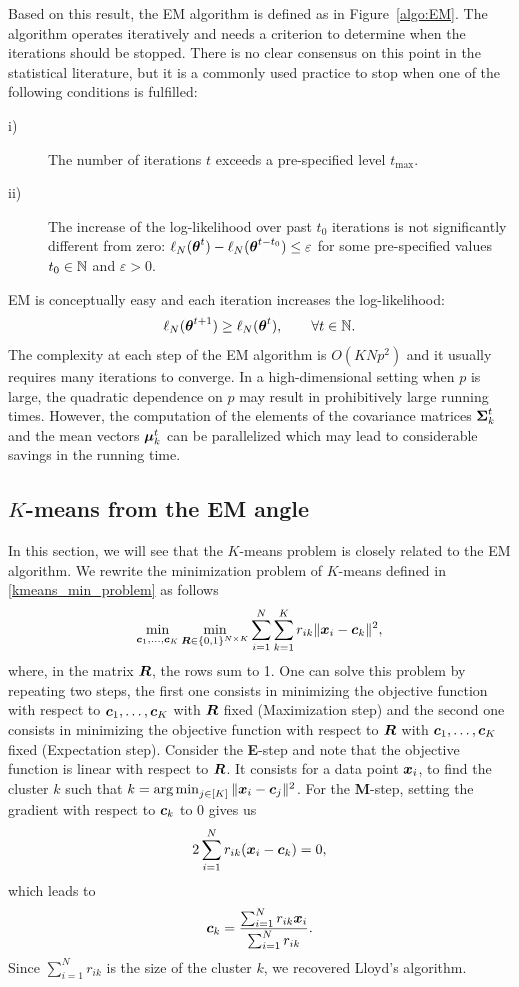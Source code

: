 Based on this result, the EM algorithm is defined as in Figure~\ref{algo:EM}.
The algorithm operates iteratively and needs a criterion to determine when
the iterations should be stopped. There is no clear consensus on this point in the
statistical literature, but it is a commonly used  practice to stop when one of the
following conditions is fulfilled:
\begin{description}
\item[i)]  The number of iterations $t$ exceeds a pre-specified level $t_{\max}$.
\item[ii)] The increase of the log-likelihood over past $t_0$ iterations is not
significantly different from zero: $\ell_N({\boldsymbol\theta}^{t})-\ell_N({\boldsymbol\theta}^{t-t_0})\le \varepsilon$
for some pre-specified values $t_0\in{\mathbb N}$ and $\varepsilon>0$.
\end{description}
EM is conceptually easy and each iteration increases the log-likelihood:
$$
\ell_N({\boldsymbol\theta}^{t+1})\ge \ell_N({\boldsymbol\theta}^{t}),\qquad \forall t\in{\mathbb N}.
$$
The complexity at each step of the EM algorithm is $O(KNp^2)$ and
it usually requires many iterations to converge. In a high-dimensional setting
when $p$ is large, the quadratic dependence on $p$ may result in prohibitively
large running times. However, the computation of the elements of the covariance
matrices $\boldsymbol\Sigma^t_k$ and the mean vectors $\boldsymbol\mu^t_k$ can be parallelized which
may lead to considerable savings in the running time.
\subsection{$K$-means from the EM angle}

In this section, we will see that the $K$-means problem is closely related to the EM algorithm. We rewrite the minimization problem of $K$-means defined in \cref{kmeans_min_problem} as follows
\begin{equation}
  \min_{\boldsymbol c_1,\dots,\boldsymbol c_K}\min_{\boldsymbol R \in \{0,1\}^{N\times K}}\sum_{i=1}^N\sum_{k=1}^K r_{ik}\|\boldsymbol x_i - \boldsymbol c_k \|^2,
\end{equation}
where, in the matrix $\boldsymbol R$, the rows sum to 1. One can solve this problem by repeating two steps, the first one consists in minimizing the objective function with respect to $\boldsymbol c_1,\dots,\boldsymbol c_K$ with $\boldsymbol R$ fixed (Maximization step) and the second one consists in minimizing the objective function with respect to $\boldsymbol R$ with $\boldsymbol c_1,\dots,\boldsymbol c_K$ fixed (Expectation step). Consider the \textbf{E}-step and note that the objective function is linear with respect to $\boldsymbol R$.  It consists for a data point $\boldsymbol x_i$, to find the cluster $k$ such that $k = \operatorname*{arg\,min}_{j\in[K]}\|\boldsymbol x_i-\boldsymbol c_j\|^2$. For the \textbf{M}-step, setting the gradient with respect to $\boldsymbol c_k$ to 0 gives us
\begin{equation}
  2\sum_{i=1}^N r_{ik} (\boldsymbol x_i-\boldsymbol c_k) = 0,
\end{equation}
which leads to
\begin{equation}
  \boldsymbol c_k = \frac{\sum_{i=1}^N r_{ik}\boldsymbol x_i}{\sum_{i=1}^N r_{ik}}.
\end{equation}
Since $\sum_{i=1}^Nr_{ik}$ is the size of the cluster $k$, we recovered Lloyd's algorithm.

